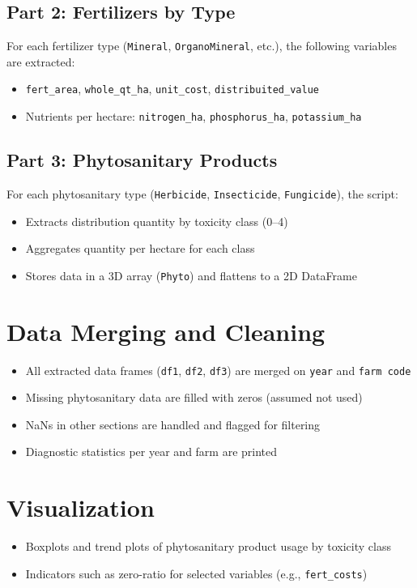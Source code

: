 \documentclass[a4paper,12pt]{article}
\begin{document}
\subsection{Part 2: Fertilizers by Type}
For each fertilizer type (\texttt{Mineral}, \texttt{OrganoMineral}, etc.), the following variables are extracted:
\begin{itemize}
    \item \texttt{fert\_area}, \texttt{whole\_qt\_ha}, \texttt{unit\_cost}, \texttt{distribuited\_value}
    \item Nutrients per hectare: \texttt{nitrogen\_ha}, \texttt{phosphorus\_ha}, \texttt{potassium\_ha}
\end{itemize}

\subsection{Part 3: Phytosanitary Products}
For each phytosanitary type (\texttt{Herbicide}, \texttt{Insecticide}, \texttt{Fungicide}), the script:
\begin{itemize}
    \item Extracts distribution quantity by toxicity class (0–4)
    \item Aggregates quantity per hectare for each class
    \item Stores data in a 3D array (\texttt{Phyto}) and flattens to a 2D DataFrame
\end{itemize}

\section{Data Merging and Cleaning}
\begin{itemize}
    \item All extracted data frames (\texttt{df1}, \texttt{df2}, \texttt{df3}) are merged on \texttt{year} and \texttt{farm code}
    \item Missing phytosanitary data are filled with zeros (assumed not used)
    \item NaNs in other sections are handled and flagged for filtering
    \item Diagnostic statistics per year and farm are printed
\end{itemize}

\section{Visualization}
\begin{itemize}
    \item Boxplots and trend plots of phytosanitary product usage by toxicity class
    \item Indicators such as zero-ratio for selected variables (e.g., \texttt{fert\_costs})
\end{itemize}
\end{document}
